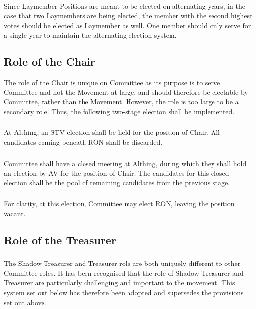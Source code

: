 \documentclass[a4paper, 11pt]{report}
\begin{document}
\paragraph{} Since Laymember Positions are meant to be elected on alternating years, in the case that two Laymembers are being elected, the member with the second highest votes should be elected as Laymember as well. One member should only serve for a single year to maintain the alternating election system.

\subsection{Role of the Chair}
\label{sec:chair}

The role of the Chair is unique on Committee as its purpose is to serve Committee and not the Movement at large, and should therefore be electable by Committee, rather than the Movement.  However, the role is too large to be a secondary role.  Thus, the following two-stage election shall be implemented.

\subsubsection{}
At Althing, an STV election shall be held for the position of Chair.  All candidates coming beneath RON shall be discarded.

\subsubsection{}
Committee shall have a closed meeting at Althing, during which they shall hold an election by AV for the position of Chair.  The candidates for this closed election shall be the pool of remaining candidates from the previous stage.

\subsubsection{}
For clarity, at this election, Committee may elect RON, leaving the position vacant.

\subsection{Role of the Treasurer}
\label{sec:treasurer}
\subsubsection{}
The Shadow Treasurer and Treasurer role are both uniquely different to other Committee roles. It has been recognised that the role of Shadow Treasurer and Treasurer are particularly challenging and important to the movement. This system set out below has therefore been adopted and supersedes the provisions set out above.
\end{document}

